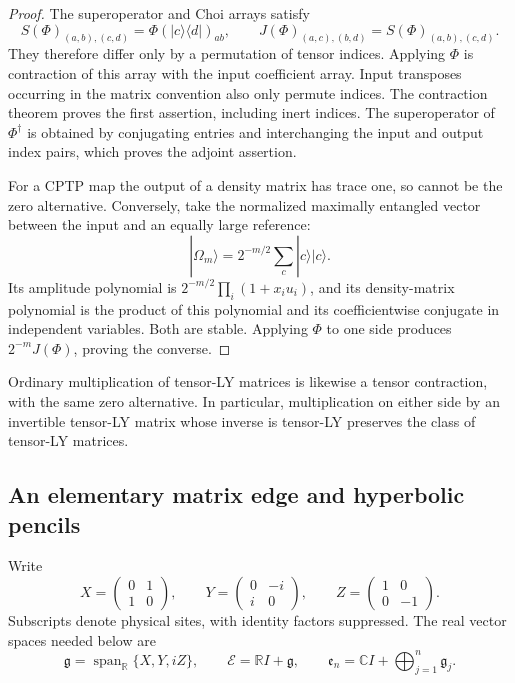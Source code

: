 \documentclass[reqno]{amsart}
\theoremstyle{definition}
\theoremstyle{remark}
\newcommand{\C}{\mathbb C}
\newcommand{\R}{\mathbb R}
\begin{document}
\begin{proof}
The superoperator and Choi arrays satisfy
\[
 S(\Phi)_{(a,b),(c,d)}=\Phi(|c\rangle\langle d|)_{ab},
 \qquad
 J(\Phi)_{(a,c),(b,d)}=S(\Phi)_{(a,b),(c,d)}.
\]
They therefore differ only by a permutation of tensor indices.  Applying
\(\Phi\) is contraction of this array with the input coefficient array.
Input transposes occurring in the matrix convention also only permute
indices.  The contraction theorem proves the first assertion, including
inert indices.  The superoperator of \(\Phi^\dagger\) is obtained by
conjugating entries and interchanging the input and output index pairs,
which proves the adjoint assertion.

For a CPTP map the output of a density matrix has trace one, so cannot
be the zero alternative.  Conversely, take the normalized maximally
entangled vector between the input and an equally large reference:
\[
 |\Omega_m\rangle=2^{-m/2}\sum_c|c\rangle|c\rangle.
\]
Its amplitude polynomial is
\(2^{-m/2}\prod_i(1+x_i u_i)\), and its density-matrix polynomial is
the product of this polynomial and its coefficientwise conjugate in
independent variables.  Both are stable.  Applying \(\Phi\) to one
side produces \(2^{-m}J(\Phi)\), proving the converse.
\end{proof}

Ordinary multiplication of tensor-LY matrices is likewise a tensor
contraction, with the same zero alternative.  In particular, multiplication
on either side by an invertible tensor-LY matrix whose inverse is
tensor-LY preserves the class of tensor-LY matrices.

\subsection{An elementary matrix edge and hyperbolic pencils}

Write
\[
 X=\begin{pmatrix}0&1\\1&0\end{pmatrix},\qquad
 Y=\begin{pmatrix}0&-i\\i&0\end{pmatrix},\qquad
 Z=\begin{pmatrix}1&0\\0&-1\end{pmatrix}.
\]
Subscripts denote physical sites, with identity factors suppressed.  The
real vector spaces needed below are
\begin{equation}
 \mathfrak g=\operatorname{span}_{\R}\{X,Y,iZ\},\qquad
 \mathcal E=\R I+\mathfrak g,
 \qquad
 \mathfrak e_n=\C I+\bigoplus_{j=1}^n\mathfrak g_j.
 \label{stat:edge-spaces}
\end{equation}
\end{document}
